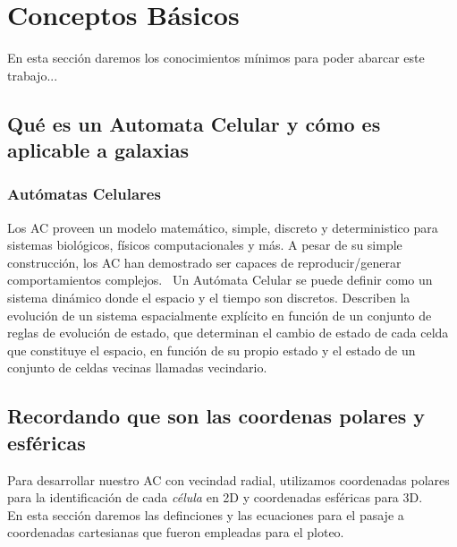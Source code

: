 \documentclass[12tp]{article}
\begin{document}
\section{Conceptos Básicos}
En esta sección daremos los conocimientos mínimos para poder abarcar este trabajo...
\subsection{Qué es un Automata Celular y cómo es aplicable a galaxias}
\subsubsection{Autómatas Celulares}
Los AC proveen un modelo matemático, simple, discreto y deterministico para sistemas biológicos, físicos computacionales y más.
A pesar de su simple construcción, los AC han demostrado ser capaces de reproducir/generar comportamientos complejos.~\cite{Wolfram1982}
Un Autómata Celular se puede definir como un sistema dinámico donde el espacio y el tiempo son discretos. Describen la evolución de un sistema espacialmente 
explícito en función de un conjunto de reglas de evolución de estado, que determinan el cambio de estado de cada celda que 
constituye el espacio, en función de su propio estado y el estado de un conjunto de celdas vecinas llamadas vecindario.~\cite{Cesimo2004}
\subsection{Recordando que son las coordenas polares y esféricas}
Para desarrollar nuestro AC con vecindad radial, utilizamos coordenadas polares para la identificación de cada \emph{célula} en 2D y
coordenadas esféricas para 3D.\\
En esta sección daremos las definciones y las ecuaciones para el pasaje a coordenadas cartesianas que fueron empleadas para el ploteo.
\end{document}
